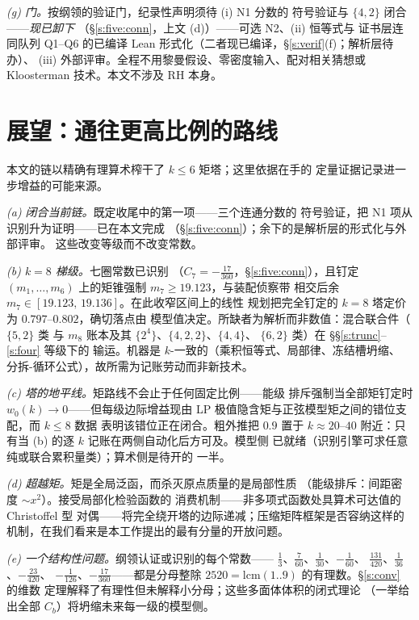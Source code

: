 \documentclass[11pt]{article}
\numberwithin{equation}{section}
\theoremstyle{definition}
\theoremstyle{remark}
\begin{document}
\emph{(g) 门。}按纲领的验证门，纪录性声明须待 (i) N1 分数的
符号验证与 $\{4,2\}$ 闭合——\emph{现已卸下}
（\S\ref{s:five:conn}，上文 (d)）——可选 N2、(ii) 恒等式与
证书层连同队列 Q1--Q6 的已编译
Lean 形式化（二者现已编译，\S\ref{s:verif}(f)；解析层待办）、
(iii) 外部评审。全程不用黎曼假设、零密度输入、配对相关猜想或
Kloosterman 技术。本文不涉及 RH 本身。

\section{展望：通往更高比例的路线}\label{s:outlook}

本文的链以精确有理算术榨干了 $k\le6$ 矩塔；这里依据在手的
定量证据记录进一步增益的可能来源。

\emph{(a) 闭合当前链。}既定收尾中的第一项——三个连通分数的
符号验证，把 N1 项从识别升为证明——已在本文完成
（\S\ref{s:five:conn}）；余下的是解析层的形式化与外部评审。
这些改变等级而不改变常数。

\emph{(b) $k=8$ 梯级。}七圈常数已识别
（$C_7=-\tfrac{17}{360}$，\S\ref{s:five:conn}），且钉定
$(m_1,\dots,m_6)$ 上的矩锥强制 $m_7\ge19.123$，与装配侦察带
相交后余 $m_7\in[19.123,\,19.136]$。在此收窄区间上的线性
规划把完全钉定的 $k=8$ 塔定价为 $0.797$--$0.802$，确切落点由
模型值决定。所缺者为解析而非数值：混合联合件（$\{5,2\}$ 类
与 $m_8$ 账本及其 $\{2^4\}$、$\{4,2,2\}$、$\{4,4\}$、
$\{6,2\}$ 类）在 \S\S\ref{s:trunc}--\ref{s:four} 等级下的
输运。机器是 $k$-一致的（乘积恒等式、局部律、冻结槽坍缩、
分拆-循环公式），故所需为记账劳动而非新技术。

\emph{(c) 塔的地平线。}矩路线不会止于任何固定比例——能级
排斥强制当全部矩钉定时 $w_0(k)\to0$——但每级边际增益现由
LP 极值隐含矩与正弦模型矩之间的错位支配，而 $k\le8$ 数据
表明该错位正在闭合。粗外推把 $0.9$ 置于 $k\approx20$--$40$
附近：只有当 (b) 的逐 $k$ 记账在两侧自动化后方可及。模型侧
已就绪（识别引擎可求任意纯或联合累积量类）；算术侧是待开的
一半。

\emph{(d) 超越矩。}矩是全局泛函，而杀灭原点质量的是局部性质
（能级排斥：间距密度 $\sim x^{2}$）。接受局部化检验函数的
消费机制——非多项式函数处具算术可达值的 Christoffel 型
对偶——将完全绕开塔的边际递减；压缩矩阵框架是否容纳这样的
机制，在我们看来是本工作提出的最有分量的开放问题。

\emph{(e) 一个结构性问题。}纲领认证或识别的每个常数——
$\tfrac13$、$\tfrac7{60}$、$\tfrac1{30}$、$-\tfrac1{60}$、
$\tfrac{131}{420}$、$\tfrac1{36}$、$-\tfrac{23}{420}$、
$-\tfrac1{126}$、$-\tfrac{17}{360}$——都是分母整除
$2520=\mathrm{lcm}(1..9)$ 的有理数。\S\ref{s:conv} 的维数
定理解释了有理性但未解释小分母；这些多面体体积的闭式理论
（一举给出全部 $C_b$）将坍缩未来每一级的模型侧。
\end{document}

